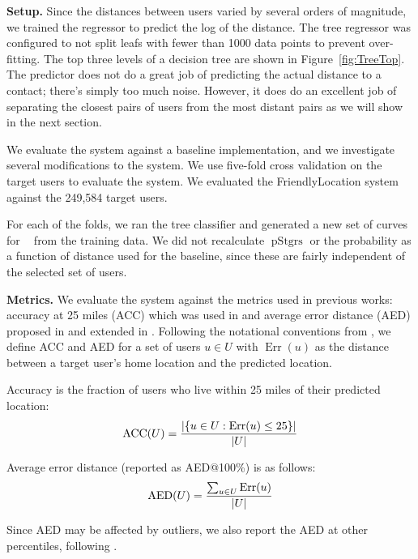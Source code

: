 \documentclass{sig-alternate}
\DeclareMathOperator{\pContact}{p^\ast}
\DeclareMathOperator{\pStrangers}{pStgrs}
\DeclareMathOperator{\Err}{Err}
\DeclareMathOperator{\AED}{AED}
\DeclareMathOperator{\ACC}{ACC}
\begin{document}
\noindent\textbf{Setup.} Since the distances between users varied by several
orders of magnitude, we trained the regressor to predict the log of the
distance.
%
The tree regressor was configured to not split leafs with fewer than 1000 data
points to prevent over-fitting.
%
The top three levels of a decision tree are shown in Figure~\ref{fig:TreeTop}.
%
The predictor does not do a great job of predicting the actual distance to a
contact; there's simply too much noise.
%
However, it does do an excellent job of separating the closest pairs of users
from the most distant pairs as we will show in the next section.



We evaluate the system against a baseline implementation, and we investigate
several modifications to the system.
%
We use five-fold cross validation on the target users to evaluate the system.
We evaluated the FriendlyLocation system against the 249,584 target users.

For each of the folds, we ran the tree classifier and generated a new set of
curves for $\pContact$ from the training data.
%
We did not recalculate $\pStrangers$ or the probability as a function of distance
used for the baseline, since these are fairly independent of the selected set
of users.

\noindent\textbf{Metrics.} We evaluate the system against the metrics used in
previous works: accuracy at 25 miles (ACC) which was used in
\cite{backstrom2010find} and average error distance (AED) proposed in
\cite{cheng2010you} and extended in \cite{li2012towards}.
%
Following the notational conventions from \cite{li2012towards}, we define ACC
and AED for a set of users $u \in U$ with $\Err(u)$ as the distance between a
target user's home location and the predicted location.

Accuracy is the fraction of users who live within 25 miles of their predicted
location:
\[
    \ACC(U) = { |\{ u \in U : \Err(u)\le25 \}| \over |U| }
\]

Average error distance (reported as AED@100\%) is as follows:
\[
    \AED(U) = { \sum_{u \in U} \Err(u) \over |U| }
\]

Since AED may be affected by outliers, we also report the AED at other
percentiles, following \cite{li2012towards}.
%
\end{document}
